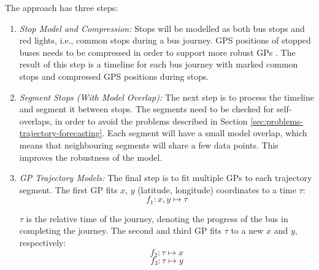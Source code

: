 The approach has three steps:
\begin{enumerate}
    \item \textit{Stop Model and Compression:}
    Stops will be modelled as both bus stops and red lights, i.e., common stops during a bus journey.
    GPS positions of stopped buses needs to be compressed in order to support more robust GPs .
    The result of this step is a timeline for each bus journey with marked common stops and compressed GPS positions during stops.

    \item \textit{Segment Stops (With Model Overlap):}
    The next step is to process the timeline and segment it between stops.
    The segments need to be checked for self-overlaps, in order to avoid the problems described in Section \ref{sec:problems-trajectory-forecasting}.
    Each segment will have a small model overlap, which means that neighbouring segments will share a few data points.
    This improves the robustness of the model.

    \item \textit{GP Trajectory Models:}
    The final step is to fit multiple GPs to each trajectory segment.
    The first GP fits $x$, $y$ (latitude, longitude) coordinates to a time $\tau$:
    \begin{equation}
       f_1: x, y \longmapsto \tau
    \end{equation}
    
    $\tau$ is the relative time of the journey, denoting the progress of the bus in completing the journey.
    The second and third GP fits $\tau$ to a new $x$ and $y$, respectively:
    \begin{equation}
        f_2: \tau \longmapsto x
    \end{equation}
    \begin{equation}
        f_3: \tau \longmapsto y
    \end{equation}
\end{enumerate}

